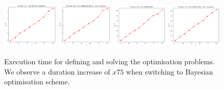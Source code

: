 \begin{figure}[h]
    \begin{center}
      \includegraphics[width=0.24\textwidth]{./Thesis/images/chapter4/exec_solve_grad.png}
      \includegraphics[width=0.24\textwidth]{./Thesis/images/chapter4/exec_solve_grad_fit.png}
      \includegraphics[width=0.24\textwidth]{./Thesis/images/chapter4/exec_solve_bo.png}
      \includegraphics[width=0.24\textwidth]{./Thesis/images/chapter4/exec_solve_bo_fit.png}          \end{center}
    \caption{Execution time for defining and solving the optimisation
      problems. We observe a duration increase of $x75$ when switching
      to Bayesian optimisation scheme.}
  \label{fig:exec_solve}
\end{figure}


